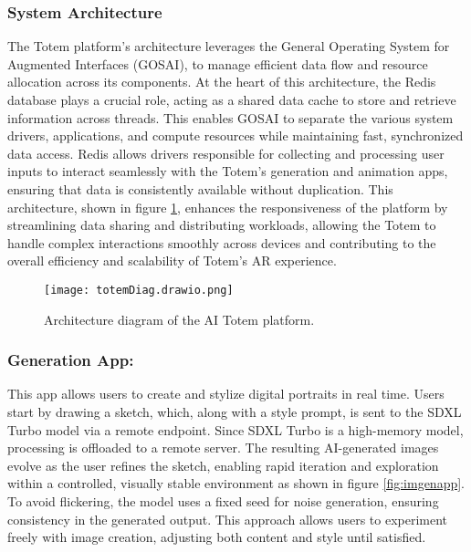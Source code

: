 \subsubsection{System Architecture}

The Totem platform's architecture leverages the General Operating System for Augmented Interfaces (GOSAI), to manage efficient data flow and resource allocation across its components.
At the heart of this architecture, the Redis\cite{carlson2013redis} database plays a crucial role, acting as a shared data cache to store and retrieve information across threads.
This enables GOSAI to separate the various system drivers, applications, and compute resources while maintaining fast, synchronized data access.
Redis allows drivers responsible for collecting and processing user inputs to interact seamlessly with the Totem’s generation and animation apps, ensuring that data is consistently available without duplication.
This architecture, shown in figure \ref{fig:diagtotem}, enhances the responsiveness of the platform by streamlining data sharing and distributing workloads, allowing the Totem to handle complex interactions smoothly across devices and contributing to the overall efficiency and scalability of Totem’s AR experience.

\begin{figure}[h!]
    \centering
    \texttt{[image: totemDiag.drawio.png]}
    \caption{Architecture diagram of the AI Totem platform.}
    \vspace{0.1cm}
    \label{fig:diagtotem}
\end{figure}

\subsubsection{ Generation App:}

This app allows users to create and stylize digital portraits in real time.
Users start by drawing a sketch, which, along with a style prompt, is sent to the SDXL Turbo model via a remote endpoint.
Since SDXL Turbo is a high-memory model, processing is offloaded to a remote server.
The resulting AI-generated images evolve as the user refines the sketch, enabling rapid iteration and exploration within a controlled, visually stable environment as shown in figure \ref{fig:imgenapp}.
To avoid flickering, the model uses a fixed seed for noise generation, ensuring consistency in the generated output.
This approach allows users to experiment freely with image creation, adjusting both content and style until satisfied.

